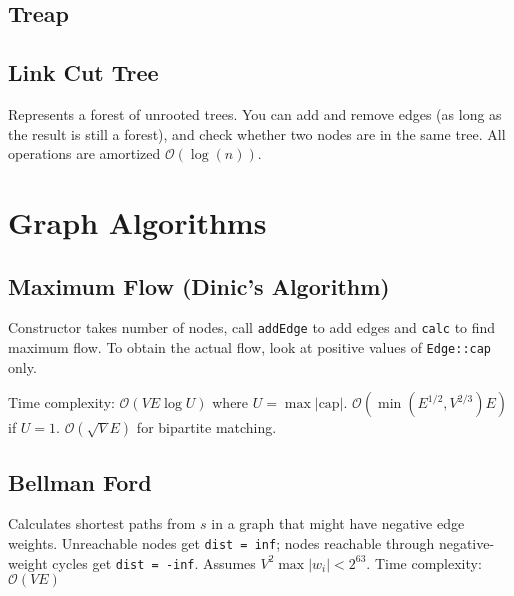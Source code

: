 \documentclass{article}
\begin{document}
\pagebreak

\subsection*{Treap}
\begin{multicols}{2}

\end{multicols}

\subsection*{Link Cut Tree}
Represents a forest of unrooted trees. You can add and remove edges (as long as the result is still a forest), and check whether two nodes are in the same tree.
All operations are amortized $\mathcal{O}(\log(n))$.
\begin{multicols}{2}

\end{multicols}


\section*{Graph Algorithms}
\subsection*{Maximum Flow (Dinic's Algorithm)}

Constructor takes number of nodes, call \lstinline{addEdge} to add edges and \lstinline{calc} to find maximum flow.
To obtain the actual flow, look at positive values of \lstinline{Edge::cap} only.

Time complexity: $\mathcal{O}(VE\log U)$ where $U = \max |\text{cap}|$.
$\mathcal{O}(\min(E^{1/2}, V^{2/3})E)$ if $U = 1$.
$\mathcal{O}(\sqrt{V}E)$ for bipartite matching.



\subsection*{Bellman Ford}

Calculates shortest paths from $s$ in a graph that might have negative edge weights.
Unreachable nodes get \lstinline{dist = inf}; nodes reachable through negative-weight cycles get \lstinline{dist = -inf}.
Assumes $V^2 \max |w_i| < 2^{63}$. Time complexity: $\mathcal{O}(VE)$
\begin{multicols}{2}

\end{multicols}
\end{document}
